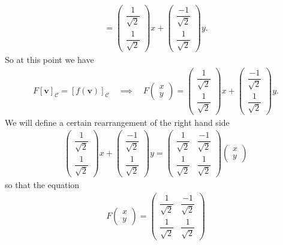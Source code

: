 {\begin{align*}
%
=
%
\begin{pmatrix}
 \dfrac{1}{\sqrt{2}} \\ \dfrac{1}{\sqrt{2}}
\end{pmatrix}x
+
\begin{pmatrix}
 \dfrac{-1}{\sqrt{2}} \\ \dfrac{1}{\sqrt{2}}
\end{pmatrix}y.
\end{align*}
So at this point we have
\begin{align*}
F[\mathbf{v}]_\mathcal{C} = [f(\mathbf{v})]_\mathcal{C} \quad\implies\quad 
F
\begin{pmatrix}
 x \\ y
\end{pmatrix}
%
=
%
\begin{pmatrix}
 \dfrac{1}{\sqrt{2}} \\ \dfrac{1}{\sqrt{2}}
\end{pmatrix}x
+
\begin{pmatrix}
 \dfrac{-1}{\sqrt{2}} \\ \dfrac{1}{\sqrt{2}}
\end{pmatrix}y.
\end{align*}
We will define a certain rearrangement of the right hand side
\begin{align*}
\begin{pmatrix}
 \dfrac{1}{\sqrt{2}} \\ \dfrac{1}{\sqrt{2}}
\end{pmatrix}x
+
\begin{pmatrix}
 \dfrac{-1}{\sqrt{2}} \\ \dfrac{1}{\sqrt{2}}
\end{pmatrix}y
=
\begin{pmatrix}
 \dfrac{1}{\sqrt{2}} & \dfrac{-1}{\sqrt{2}} \\ 
 \dfrac{1}{\sqrt{2}} & \dfrac{1}{\sqrt{2}}
\end{pmatrix}
\begin{pmatrix}
 x \\ y
\end{pmatrix}
\end{align*}
so that the equation
\begin{align*}
F
\begin{pmatrix}
 x \\ y
\end{pmatrix}
%
=
%
\begin{pmatrix}
 \dfrac{1}{\sqrt{2}} & \dfrac{-1}{\sqrt{2}} \\ 
 \dfrac{1}{\sqrt{2}} & \dfrac{1}{\sqrt{2}}

\end{pmatrix}
\end{align*}}
